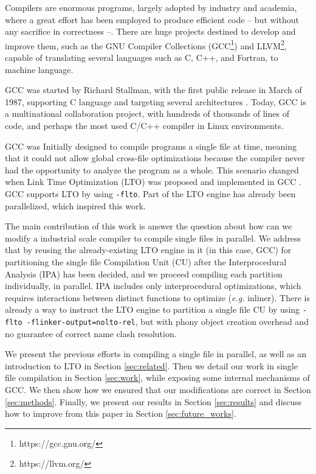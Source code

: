 \documentclass[runningheads]{llncs}
\begin{document}
Compilers are enormous programs, largely adopted by industry and academia, where
a great effort has been employed to produce efficient code --
but without any sacrifice in correctness --. There are huge projects destined
to develop and improve them, such as the GNU Compiler Collections
(GCC\footnote{https://gcc.gnu.org/}) and LLVM\footnote{https://llvm.org/}, capable
of translating several languages such as C, C++, and Fortran, to machine language.

GCC was started by Richard Stallman, with the first public release in March of
1987, supporting C language and targeting several architectures
\cite{gcc-first-ver}. Today, GCC is a multinational collaboration
project, with hundreds of thousands of lines of code, and perhaps the most used C/C++
compiler in Linux environments.

GCC was Initially designed to compile programs a single file at time, meaning
that it could not allow global cross-file optimizations because the compiler
never had the opportunity to analyze the program as a whole. This scenario
changed when Link Time Optimization (LTO) was proposed \cite{gcc-lto,whoprgoogle} and
implemented in GCC \cite{glek2010optimizing}. GCC supports LTO by using
\texttt{-flto}. Part of the LTO engine has already been parallelized, which
inspired this work.

The main contribution of this work is answer the question about how can we modify a
industrial scale compiler to compile single files in parallel. We address
that by reusing the already-existing LTO engine in it (in this
case, GCC) for partitioning the single file Compilation Unit (CU) after the
Interprocedural Analysis (IPA) has been decided, and we proceed compiling
each partition individually, in parallel. IPA includes only interprocedural
optimizations, which requires interactions between distinct functions to optimize
(\emph{e.g.} inliner). There is already a way to instruct
the LTO engine to partition a single file CU by using
\texttt{-flto -flinker-output=nolto-rel}, but with phony object creation
overhead and no guarantee of correct name clash resolution.

We present the previous efforts in compiling a single file in
parallel, as well as an introduction to LTO in Section \ref{sec:related}.
Then we detail our work in single file compilation in
Section \ref{sec:work}, while exposing some internal mechanisms
of GCC. We then show how we ensured that our modifications are correct
in Section \ref{sec:methods}. Finally, we present our results in
Section \ref{sec:results} and discuss how to improve from this paper
in Section \ref{sec:future_works}.
\end{document}
